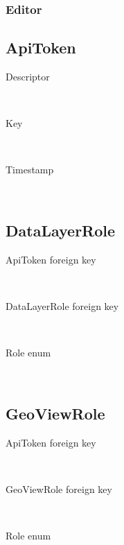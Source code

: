 \subsubsection{Editor}


\subsection{ApiToken}
\begin{description}
\item[Descriptor] \hfill \\
\item[Key] \hfill \\
\item[Timestamp] \hfill \\

\end{description}

\subsection{DataLayerRole}
\begin{description}
\item[ApiToken foreign key] \hfill \\
\item[DataLayerRole foreign key] \hfill \\
\item[Role enum] \hfill \\
\end{description}

\subsection{GeoViewRole}
\begin{description}
\item[ApiToken foreign key] \hfill \\
\item[GeoViewRole foreign key] \hfill \\
\item[Role enum] \hfill \\

\end{description}








